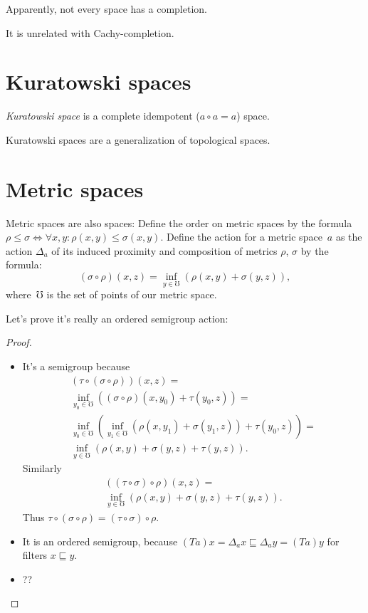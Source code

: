 \begin{note}
Apparently, not every space has a completion.
\end{note}

\begin{note}
It is unrelated with Cachy-completion.
\end{note}

\section{Kuratowski spaces}

\begin{defn}
\emph{Kuratowski space} is a complete idempotent ($a\circ a=a$) space.
\end{defn}

Kuratowski spaces are a generalization of topological spaces.

\section{Metric spaces}

Metric spaces are also spaces: Define the order on metric spaces by the formula $\rho\leq\sigma \Leftrightarrow \forall x,y:\rho(x,y)\leq\sigma(x,y)$. Define the action for a metric space~$a$ as the action $\Delta_a$ of its induced proximity and composition of metrics $\rho$, $\sigma$ by the formula: \[ (\sigma\circ\rho)(x,z) = \inf_{y\in\mho}(\rho(x,y)+\sigma(y,z)), \]
where~$\mho$ is the set of points of our metric space.

Let's prove it's really an ordered semigroup action:

\begin{proof}
~
\begin{itemize}
\item It's a semigroup because
\begin{multline*}
(\tau\circ(\sigma\circ\rho))(x,z) = \\
\inf_{y_0\in\mho}((\sigma\circ\rho)(x,y_0)+\tau(y_0,z)) = \\
\inf_{y_0\in\mho}(\inf_{y_1\in\mho}(\rho(x,y_1)+\sigma(y_1,z))+\tau(y_0,z)) = \\
\inf_{y\in\mho}(\rho(x,y)+\sigma(y,z)+\tau(y,z)).
\end{multline*}
Similarly 
\begin{multline*}
((\tau\circ\sigma)\circ\rho)(x,z) = \\
\inf_{y\in\mho}(\rho(x,y)+\sigma(y,z)+\tau(y,z)).
\end{multline*}
Thus $\tau\circ(\sigma\circ\rho)=(\tau\circ\sigma)\circ\rho$.

\item It is an ordered semigroup, because
$(Ta)x = \Delta_a x \sqsubseteq \Delta_a y = (Ta)y$ 
for filters $x\sqsubseteq y$.

\item ??
\end{itemize}
\end{proof}


